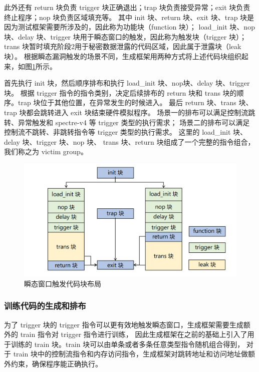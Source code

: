 此外还有 return 块负责 trigger 块正确退出；trap 块负责接受异常；exit 块负责终止程序；nop 块负责区域填充等。
其中 init 块、return 块、exit 块、trap 块是因为测试框架需要所涉及的，因此称为功能块（function 块）；
load\_init 块、nop 块、delay 块、trigger 块用于瞬态窗口的触发，因此称为触发块（trigger 块）；
trans 块暂时填充阶段2用于秘密数据泄露的代码区域，因此属于泄露块（leak 块）。
根据瞬态漏洞触发的场景不同，生成框架用两种方式将上述代码块组织起来，如图\ref{paper:trigger-dist}所示。\par

首先执行 init 块，然后顺序排布和执行 load\_init 块、nop块、delay 块、trigger 块。
根据 trigger 指令的指令类别，决定后续排布的 return 块和 trans 块的顺序。trap 块位于其他位置，在异常发生的时候进入。
最后 return 块、trans 块、trap 块都会跳转进入 exit 块结束硬件模拟程序。
场景一的排布可以满足控制流跳转、异常触发和 spectre-v4 等 trigger 类型的执行需求；
场景二的排布可以满足控制流不跳转、非跳转指令等 trigger 类型的执行需求。
这里的 load\_init 块、delay 块、trigger 块、nop 块、
trans 块、return 块组成了一个完整的指令组合，我们称之为 victim group。\par

\begin{figure}[!h]
    \centering
    \includegraphics[width=0.8\linewidth]{figure/paper/arrange-stage1.png}
    \caption{瞬态窗口触发代码块布局}
    \label{paper:trigger-dist}
\end{figure}

\subsubsection{训练代码的生成和排布}

为了 trigger 块的 trigger 指令可以更有效地触发瞬态窗口，生成框架需要生成额外的 train 指令对 trigger 指令进行训练，
因此生成框架在之前的基础上引入了用于训练的 train 块。train 块可以由单条或者多条任意类型指令随机组合得到，
对于 train 块中的控制流指令和内存访问指令，生成框架对跳转地址和访问地址做额外约束，确保程序能正确执行。\par

